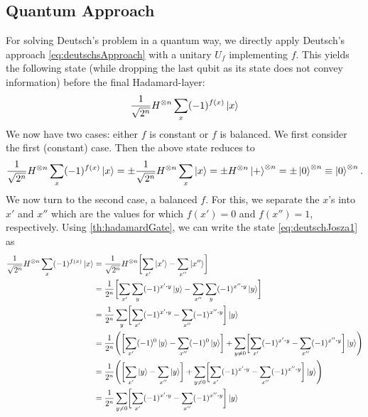 		\subsection{Quantum Approach}
			For solving Deutsch's problem in a quantum way, we directly apply Deutsch's approach \eqref{eq:deutschsApproach} with a unitary \(U_f\) implementing \(f\). This yields the following state (while dropping the last qubit as its state does not convey information) before the final Hadamard-layer:
			\begin{equation}
				\frac{1}{\sqrt{2^n}} H^{\otimes n} \sum_x (-1)^{f(x)} \ket{x}  \label{eq:deutschJosza1}
			\end{equation}
			We now have two cases: either \(f\) is constant or \(f\) is balanced. We first consider the first (constant) case. Then the above state reduces to
			\begin{equation}
				\frac{1}{\sqrt{2^n}} H^{\otimes n} \sum_x (-1)^{f(x)} \ket{x}
					= \pm \frac{1}{\sqrt{2^n}} H^{\otimes n} \sum_x \ket{x}
					= \pm H^{\otimes n} \ket{+}^{\otimes n}
					= \pm \ket{0}^{\otimes n}
					\equiv \ket{0}^{\otimes n}.
			\end{equation}
			We now turn to the second case, a balanced \(f\). For this, we separate the \(x\)'s into \(x'\) and \(x''\) which are the values for which \(f(x') = 0\) and \(f(x'') = 1\), respectively. Using \eqref{th:hadamardGate}, we can write the state \eqref{eq:deutschJosza1} as
			\begin{align}
				\frac{1}{\sqrt{2^n}} H^{\otimes n} \sum_x (-1)^{f(x)} \ket{x}
					&= \frac{1}{\sqrt{2^n}} H^{\otimes n} \biggl[ \sum_{x'} \ket{x'} - \sum_{x''} \ket{x''} \biggr] \\
					&= \frac{1}{2^n} \biggl[ \sum_{x'} \sum_y (-1)^{x' \dotproduct y} \ket{y} - \sum_{x''} \sum_y (-1)^{x'' \dotproduct y} \ket{y} \biggr] \\
					&= \frac{1}{2^n} \sum_y \biggl[ \sum_{x'} (-1)^{x' \dotproduct y} - \sum_{x''} (-1)^{x'' \dotproduct y} \biggr] \ket{y} \\
					&= \frac{1}{2^n} \Biggl( \biggl[ \sum_{x'} (-1)^{0} \ket{y} - \sum_{x''} (-1)^{0} \ket{y} \biggr] + \sum_{y \neq 0} \biggl[ \sum_{x'} (-1)^{x' \dotproduct y} - \sum_{x''} (-1)^{x'' \dotproduct y} \biggr] \ket{y} \Biggr) \\
					&= \frac{1}{2^n} \Biggl( \biggl[ \sum_{x'} \ket{y} - \sum_{x''} \ket{y} \biggr] + \sum_{y \neq 0} \biggl[ \sum_{x'} (-1)^{x' \dotproduct y} - \sum_{x''} (-1)^{x'' \dotproduct y} \biggr] \ket{y} \Biggr) \\
					&= \frac{1}{2^n} \sum_{y \neq 0} \biggl[ \sum_{x'} (-1)^{x' \dotproduct y} - \sum_{x''} (-1)^{x'' \dotproduct y} \biggr] \ket{y}
			\end{align}
